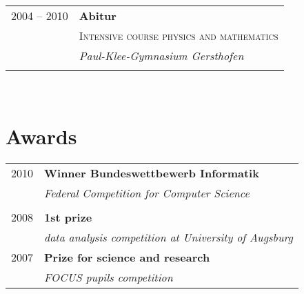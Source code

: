 \documentclass[a4paper,10pt]{article} %
\begin{document}
{\begin{minipage}[t]{0.44\textwidth}
\begin{tabular}{rl}

2004 -- 2010 & \textbf{Abitur}\\
& \textsc{Intensive course physics and mathematics} \\
& \textit{Paul-Klee-Gymnasium Gersthofen}\\
&\\


\end{tabular}\\[10pt]


\section{Awards}

\begin{tabular}{rl}
2010	 & \textbf{Winner Bundeswettbewerb Informatik}\\
& \textit{Federal Competition for Computer Science}\\ \\


2008	 & \textbf{1st prize}\\
& \textit{data analysis competition at University of Augsburg}\\[10pt]




2007	 & \textbf{Prize for science and research}\\
& \textit{FOCUS pupils competition}
\end{tabular}\\[10pt]


\end{minipage}}
\end{document}
